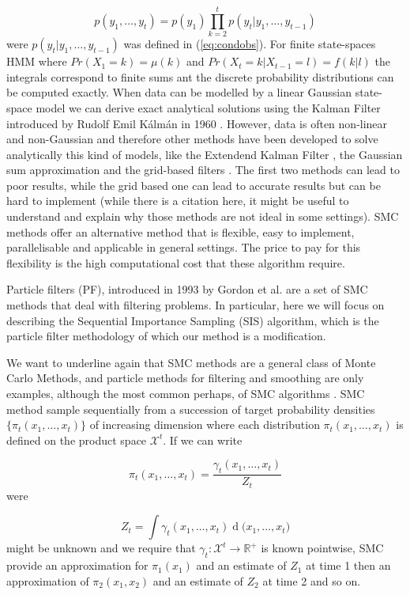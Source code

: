 \documentclass[11pt,a4paper]{article}
\renewcommand{\d}[1]{\ensuremath{\operatorname{d}\!{#1}}}
\begin{document}
\begin{equation*}
    p(y_1, \dots, y_t) = p(y_1)\prod_{k=2}^t p(y_t | y_1, \dots, y_{t-1})
\end{equation*}
were $p(y_t | y_1, \dots, y_{t-1})$ was defined in (\ref{eq:condobs}).
For finite state-spaces HMM where $Pr(X_1 = k) = \mu(k)$ and $Pr(X_t = k | X_{t-1} = l) = f(k|l)$ the integrals correspond to finite sums ant the discrete probability distributions can be computed exactly. 
When data can be modelled by a linear Gaussian state-space model we can derive exact analytical solutions using the Kalman Filter introduced by Rudolf Emil K\'alm\'an in 1960 \cite{Kalman}. However, data is often non-linear and non-Gaussian and therefore other methods have been developed to solve analytically this kind of models, like the Extendend Kalman Filter \cite{Anderson} \cite{Jazwinski}, the Gaussian sum approximation \cite{Soreson} and the grid-based filters \cite{Bucy}. The first two methods can lead to poor results, while the grid based one can lead to accurate results but can be hard to implement (while there is a citation here, it might be useful to understand and explain why those methods are not ideal in some settings). SMC methods offer an alternative method that is flexible, easy to implement, parallelisable and applicable in general settings\cite{DoucetBook}. The price to pay for this flexibility is the high computational cost that these algorithm require.

Particle filters (PF), introduced in 1993 by Gordon et al. \cite{Gordon} are a set of SMC methods that deal with filtering problems. In particular, here we will focus on describing the Sequential Importance Sampling (SIS) algorithm, which is the particle filter methodology of which our method is a modification.

We want to underline again that SMC methods are a general class of Monte Carlo Methods, and particle methods for filtering and smoothing are only examples, although the most common perhaps, of SMC algorithms \cite{DoucetTutorial}. SMC method sample sequentially from a succession of target probability densities $\{ \pi_t(x_1, \dots, x_t) \}$ of increasing dimension where each distribution $\pi_t(x_1, \dots, x_t)$ is defined on the product space $\mathcal{X}^t$. If we can write

\begin{equation*}
    \pi_t(x_1, \dots, x_t) = \frac{\gamma_t(x_1, \dots, x_t)}{Z_t}
\end{equation*}
were

\begin{equation*}
    Z_t = \int \gamma_t(x_1, \dots, x_t) \d (x_1, \dots, x_t)
\end{equation*}
might be unknown and we require that $\gamma_t : \mathcal{X}^t \rightarrow \mathbb{R}^+$ is known pointwise, SMC provide an approximation for $\pi_1(x_1)$ and an estimate of $Z_1$ at time 1 then an approximation of $\pi_2(x_1, x_2)$ and an estimate of $Z_2$ at time 2 and so on.
\end{document}
